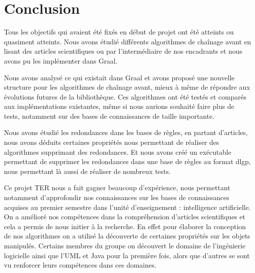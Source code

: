 \section{Conclusion}

Tous les objectifs qui avaient été fixés en début de projet ont été atteints ou quasiment atteints. Nous avons étudié différents algorithmes de chaînage avant en lisant des articles scientifiques ou par l'intermédiaire de nos encadrants et nous avons pu les implémenter dans Graal. 
\par Nous avons analysé ce qui existait dans Graal et avons proposé une nouvelle structure pour les algorithmes de chaînage avant, mieux à même de répondre aux évolutions futures de la bibliothèque. Ces algorithmes ont été testés et comparés aux implémentations existantes, même si nous aurions souhaité faire plus de tests, notamment sur des bases de connaissances de taille importante. 
\par Nous avons étudié les redondances dans les bases de règles, en partant d'articles, nous avons déduits certaines propriétés nous permettant de réaliser des algorithmes supprimant des redondances. Et nous avons créé un exécutable permettant de supprimer les redondances dans une base de règles au format dlgp, nous permettant là aussi de réaliser de nombreux tests. 



\par Ce projet TER nous a fait gagner beaucoup d'expérience, nous permettant notamment d'approfondir nos connaissances sur les bases de connaissances acquises au premier semestre dans l'unité d'enseignement : intelligence artificielle. On a amélioré nos compétences dans la compréhension d'articles scientifiques et cela a permis de nous initier à la recherche. En effet pour élaborer la conception de nos algorithmes on a utilisé la découverte de certaines propriétés sur les objets manipulés. Certains membres du groupe on découvert le domaine de l'ingénierie logicielle ainsi que l'UML et Java pour la première fois, alors que d'autres se sont vu renforcer leurs compétences dans ces domaines. 

